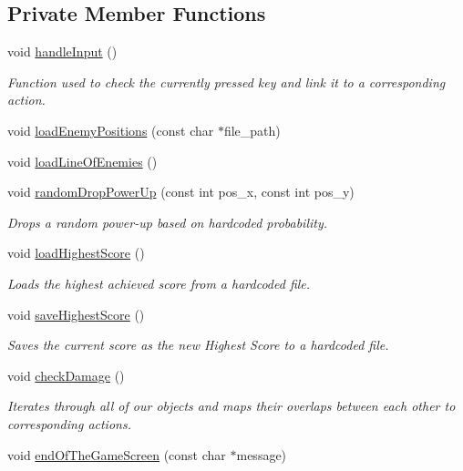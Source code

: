\subsection*{Private Member Functions}
\begin{DoxyCompactItemize}
\item 
void \hyperlink{classGeus_ac562cba645d11b3ead596a40f2138ae8}{handle\+Input} ()
\begin{DoxyCompactList}\small\item\em Function used to check the currently pressed key and link it to a corresponding action. \end{DoxyCompactList}\item 
void \hyperlink{classGeus_a203be0301bb8cf927691e104184a9d1a}{load\+Enemy\+Positions} (const char $\ast$file\+\_\+path)
\item 
void \hyperlink{classGeus_a2992ad2cc9b243e28a0f344721ac217d}{load\+Line\+Of\+Enemies} ()
\item 
void \hyperlink{classGeus_a9543c5d421c0a5926bfb16d59bbcab12}{random\+Drop\+Power\+Up} (const int pos\+\_\+x, const int pos\+\_\+y)
\begin{DoxyCompactList}\small\item\em Drops a random power-\/up based on hardcoded probability. \end{DoxyCompactList}\item 
void \hyperlink{classGeus_a43863016c0866aae15e64994c6f4f45f}{load\+Highest\+Score} ()
\begin{DoxyCompactList}\small\item\em Loads the highest achieved score from a hardcoded file. \end{DoxyCompactList}\item 
void \hyperlink{classGeus_ac39cd26c767b6508030a3a203de80ade}{save\+Highest\+Score} ()
\begin{DoxyCompactList}\small\item\em Saves the current score as the new Highest Score to a hardcoded file. \end{DoxyCompactList}\item 
void \hyperlink{classGeus_a53d54fe777e1eeecbfcd64c852b5322a}{check\+Damage} ()
\begin{DoxyCompactList}\small\item\em Iterates through all of our objects and maps their overlaps between each other to corresponding actions. \end{DoxyCompactList}\item 
void \hyperlink{classGeus_a1325fd4454fd45be398e140b3bcc1120}{end\+Of\+The\+Game\+Screen} (const char $\ast$message)
\end{DoxyCompactItemize}
